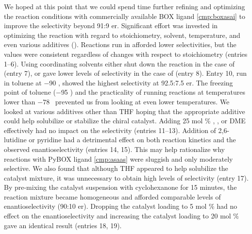 We hoped at this point that we could spend time further refining and optimizing the reaction
conditions with commercially available BOX ligand \ref{cmp:boxasai} to improve the selectivity beyond 91:9 er.
Significant effort was invested in optimizing the reaction with regard to stoichiometry, solvent, temperature, and even
various additives (). Reactions run in  afforded lower
selectivities, but the values were consistent regardless of changes with respect to
stoichiometry (entries 1--6). Using coordinating solvents either shut down the reaction in the case of  (entry
7), or gave lower levels of selectivity in the case of  (entry 8). Entry 10, run in
toluene at $-$90 \degc, showed the highest selectivity at 92.5:7.5 er. The freezing point of toluene
($-$95 \degc) and the practicality of running reactions at temperatures lower than $-78$ \degc\
prevented us from looking at even lower temperatures. We looked at various additives other than THF
hoping that the appropriate additive could help solubilize or stabilize the chiral catalyst. Adding
25 mol \%  \ce{CH3CN}, \ce{Et2O}, or DME  effectively had no impact on the
selectivity (entries 11--13). Addition of 2,6-lutidine or pyridine had a detrimental effect on both
reaction kinetics and the observed enantioselectivity (entries 14, 15). This may help rationalize
why reactions with PyBOX ligand \ref{cmp:asaas} were sluggish and only moderately selective. We also
found that although THF appeared to help solubilize the catalyst mixture, it was unnecessary to
obtain high levels of selectivity (entry 17). By pre-mixing the catalyst suspension with
cyclohexanone for 15 minutes, the reaction mixture became homogeneous and afforded comparable
levels of enantioselectivity (90:10 er).
Dropping the catalyst loading to 5 mol \% had no effect on the enantioselectivity and increasing the catalyst loading to 20 mol \% gave an identical result (entries 18, 19).

